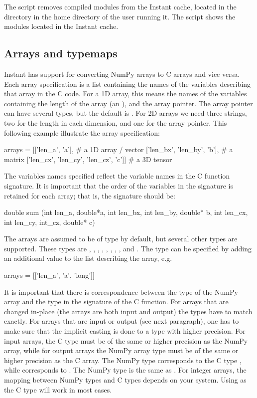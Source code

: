 The script  removes
compiled modules from the Instant cache, located in the directory
 in the home directory of the user running it.
The script 
shows the modules located in the Instant cache.

\subsection{Arrays and typemaps}\label{wilbers:sec:arrays}

Instant has support for converting NumPy arrays to C arrays and vice
versa. Each array specification is a list containing the names of the
variables describing that array in the C code. For a 1D array, this
means the names of the variables containing the length of the array
(an ), and the array pointer. The array pointer can have
several types, but the default is . For 2D arrays we need
three strings, two for the length in each dimension, and one for the
array pointer. This following example illustrate the array
specification:
\begin{python}
arrays = [['len_a', 'a'],                        # a 1D array / vector
          ['len_bx', 'len_by', 'b'],           # a matrix
          ['len_cx', 'len_cy', 'len_cz', 'c']] # a 3D tensor
\end{python}
The variables names specified reflect the variable names in the C function
signature. It is important that the order of the variables in the signature is
retained for each array; that is, the signature should be:
\begin{c++}
double sum (int len_a, double*a,
	          int len_bx, int len_by, double* b,
	          int len_cx, int len_cy, int_cz, double* c)
\end{c++}
The arrays are assumed to be of type  by default, but
several other types are supported. These types
are , , , , , , , ,
and . The type can be specified by adding an
additional value to the list describing the array, e.g.
\begin{python}
arrays = [['len_a', 'a', 'long']]
\end{python}
It is important that there is correspondence between the type of the
NumPy array and the type in the signature of the C function. For
arrays that are changed in-place (the arrays are both
input and output) the types have to match exactly. For
arrays that are input or output (see next paragraph), one has to make
sure that the implicit casting is done to a type with higher
precision. For input arrays, the C type must be of the same or higher
precision as the NumPy array, while for output arrays the NumPy array
type must be of the same or higher precision as the C array. The
NumPy type  corresponds to the C type ,
while  corresponds to . The NumPy
type  is the same as . For integer arrays, the
mapping between NumPy types and C types depends on your
system. Using  as the C type will work in most cases.


